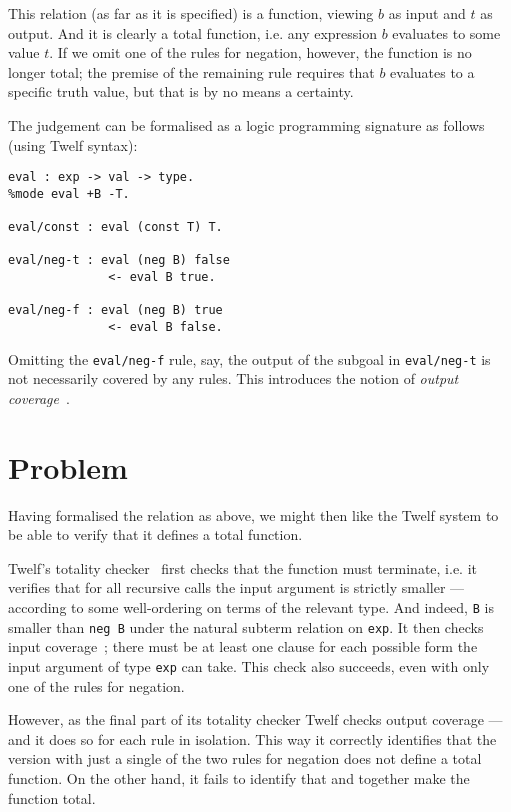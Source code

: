 \documentclass[12pt]{article}
\begin{document}
This relation (as far as it is specified) is a function, viewing $b$ as input and $t$ as output.
And it is clearly a total function, i.e. any expression $b$ evaluates to some value $t$.
If we omit one of the rules for negation, however, the function is no longer total;
the premise of the remaining rule requires that $b$ evaluates to a specific truth value, but that is by no means a certainty.

The judgement can be formalised as a logic programming signature as follows (using Twelf syntax):
\begin{center}
\begin{BVerbatim}
eval : exp -> val -> type.

eval/const : eval (const T) T.

eval/neg-t : eval (neg B) false
              <- eval B true.

eval/neg-f : eval (neg B) true
              <- eval B false.
\end{BVerbatim}
\end{center}
Omitting the \texttt{eval/neg-f} rule, say, the output of the subgoal in \texttt{eval/neg-t} is not necessarily covered by any rules.
This introduces the notion of \textit{output coverage}~\cite{OutputCoverage}.

\section*{Problem}

Having formalised the relation as above, we might then like the Twelf system to be able to verify that it defines a total function.

Twelf's totality checker~\cite[ch. 9.3]{TwelfUserGuide} first checks that the function must terminate, i.e. it verifies that for all recursive calls the input argument is strictly smaller --- according to some well-ordering on terms of the relevant type.
And indeed, \texttt{B} is smaller than \texttt{neg B} under the natural subterm relation on \texttt{exp}.
It then checks input coverage~\cite{SchurmannPfenning03}; there must be at least one clause for each possible form the input argument of type \texttt{exp} can take.
This check also succeeds, even with only one of the rules for negation.

However, as the final part of its totality checker Twelf checks output coverage --- and it does so for each rule in isolation.
This way it correctly identifies that the version with just a single of the two rules for negation does not define a total function.
On the other hand, it fails to identify that  and  together make the function total.
\end{document}
